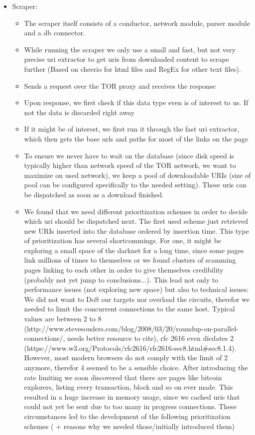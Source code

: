\begin{itemize}
  \item Scraper:
    \begin{itemize}
      \item The scraper itself consists of a conductor, network module, parser module and a db connector.
      \item While running the scraper we only use a small and fast, but not very precise uri extractor to get uris from downloaded content to scrape further (Based on cheerio for html files and RegEx for other text files).
      \item Sends a request over the TOR proxy and receives the response
      \item Upon response, we first check if this data type even is of interest to us. If not the data is discarded right away
      \item If it might be of interest, we first run it through the fast uri extractor, which then gets the base urls and paths for most of the links on the page
      \item To ensure we never have to wait on the database (since disk speed is typically higher than network speed of the TOR network, we want to maximize on used network), we keep a pool of downloadable URIs (size of pool can be configured specifically to the needed setting). These uris can be dispatched as soon as a download finished.
      \item We found that we need different prioritization schemes in order to decide which uri should be dispatched next. The first used scheme just retrieved new URIs inserted into the database ordered by insertion time. This type of prioritization has several shortcommings. For one, it might be exploring a small space of the darknet for a long time, since some pages link millions of times to themselves or we found clusters of scamming pages linking to each other in order to give themselves credibility (probably not yet jump to conclusions...). This lead not only to performance issues (not exploring new space) but also to technical issues: We did not want to DoS our targets nor overload the circuits, therefor we needed to limit the concurrent connections to the same host. Typical values are between 2 to 8 (http://www.stevesouders.com/blog/2008/03/20/roundup-on-parallel-connections/, needs better resource to cite), rfc 2616 even dicdates 2 (https://www.w3.org/Protocols/rfc2616/rfc2616-sec8.html#sec8.1.4). However, most modern browsers do not comply with the limit of 2 anymore, therefor 4 seemed to be a sensible choice. After introducing the rate limiting we soon discovered that there are pages like bitcoin explorers, listing every transaction, block and so on ever made. This resulted in a huge increase in memory usage, since we cached uris that could not yet be sent due to too many in progress connections. These circumstances led to the development of the following prioritization schemes ( + reasons why we needed those/initially introduced them)

\end{itemize}
\end{itemize}
